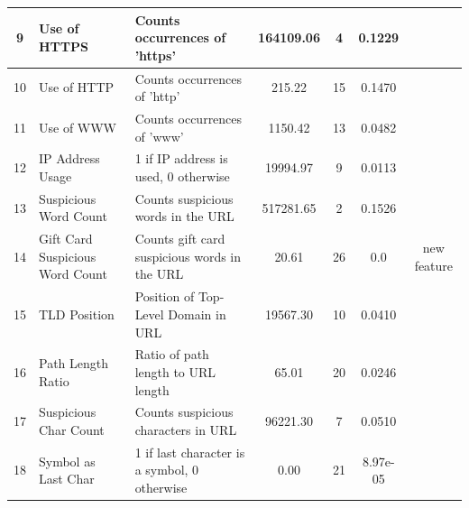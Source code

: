 \documentclass{article}
\begin{document}
\begin{table}[H]
\begin{adjustwidth}{-3cm}{}
\begin{tabular}{|c|p{4cm}|p{5cm}|c|c|c|c|}
                9            & Use of HTTPS                    & Counts occurrences of 'https'                  & 164109.06          & 4                    & 0.1229                   & \cite{PhishSafe}                                \\ \hline
                10           & Use of HTTP                     & Counts occurrences of 'http'                   & 215.22             & 15                   & 0.1470                   & \cite{PhishSafe} \cite{LexicalFeatureSelection} \\ \hline
                11           & Use of WWW                      & Counts occurrences of 'www'                    & 1150.42            & 13                   & 0.0482                   & \cite{PhishingURLDetection}                     \\ \hline
                12           & IP Address Usage                & 1 if IP address is used, 0 otherwise           & 19994.97           & 9                    & 0.0113                   & \cite{LexicalFeatureSelection}                  \\ \hline
                13           & Suspicious Word Count           & Counts suspicious words in the URL             & 517281.65          & 2                    & 0.1526                   & \cite{PhishSafe} \cite{LexicalFeatureSelection} \\ \hline
                14           & Gift Card Suspicious Word Count & Counts gift card suspicious words in the URL   & 20.61              & 26                   & 0.0                      & new feature \\ \hline
                15           & TLD Position                    & Position of Top-Level Domain in URL            & 19567.30           & 10                   & 0.0410                   & \cite{PhishSafe}                                \\ \hline
                16           & Path Length Ratio               & Ratio of path length to URL length             & 65.01              & 20                   & 0.0246                   & \cite{LexicalFeatureSelection}                  \\ \hline
                17           & Suspicious Char Count           & Counts suspicious characters in URL            & 96221.30           & 7                    & 0.0510                   & \cite{LexicalFeatureSelection}                  \\ \hline
                18           & Symbol as Last Char             & 1 if last character is a symbol, 0 otherwise   & 0.00               & 21                   & 8.97e-05                 & \cite{LexicalFeatureSelection} \\ \hline

\end{tabular}
\end{adjustwidth}
\end{table}
\end{document}

